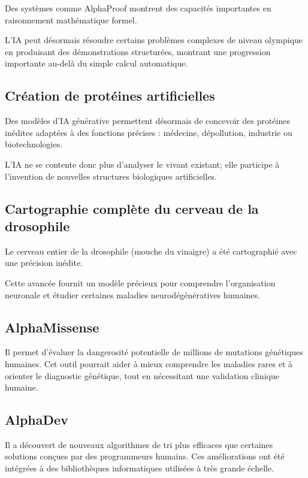 \documentclass[
  10pt,
  a4paper,
  DIV=11,
  numbers=noendperiod,
  oneside]{scrreprt}
\begin{document}
Des systèmes comme AlphaProof montrent des capacités importantes en
raisonnement mathématique formel.

L'IA peut désormais résoudre certains problèmes complexes de niveau
olympique en produisant des démonstrations structurées, montrant une
progression importante au-delà du simple calcul automatique.

\subsection{Création de protéines
artificielles}\label{cruxe9ation-de-protuxe9ines-artificielles}

Des modèles d'IA générative permettent désormais de concevoir des
protéines inédites adaptées à des fonctions précises : médecine,
dépollution, industrie ou biotechnologies.

L'IA ne se contente donc plus d'analyser le vivant existant; elle
participe à l'invention de nouvelles structures biologiques
artificielles.

\subsection{Cartographie complète du cerveau de la
drosophile}\label{cartographie-compluxe8te-du-cerveau-de-la-drosophile}

Le cerveau entier de la drosophile (mouche du vinaigre) a été
cartographié avec une précision inédite.

Cette avancée fournit un modèle précieux pour comprendre l'organisation
neuronale et étudier certaines maladies neurodégénératives humaines.

\subsection{AlphaMissense}\label{alphamissense}

Il permet d'évaluer la dangerosité potentielle de millions de mutations
génétiques humaines. Cet outil pourrait aider à mieux comprendre les
maladies rares et à orienter le diagnostic génétique, tout en
nécessitant une validation clinique humaine.

\subsection{AlphaDev}\label{alphadev}

Il a découvert de nouveaux algorithmes de tri plus efficaces que
certaines solutions conçues par des programmeurs humains. Ces
améliorations ont été intégrées à des bibliothèques informatiques
utilisées à très grande échelle.
\end{document}

